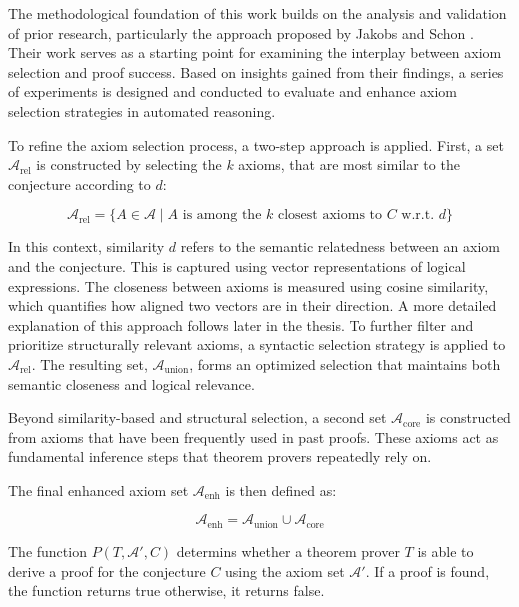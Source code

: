 \documentclass[english,version-2020-11]{uzl-thesis}
\begin{document}
The methodological foundation of this work builds on the analysis and validation of prior research, particularly the approach proposed by Jakobs and Schon \cite{Schon2024}. Their work serves as a starting point for examining the interplay between axiom selection and proof success. Based on insights gained from their findings, a series of experiments is designed and conducted to evaluate and enhance axiom selection strategies in automated reasoning.

To refine the axiom selection process, a two-step approach is applied. First, a set \( \mathcal{A}_{\text{rel}} \) is constructed by selecting the \( k \)  axioms, that are most similar to the conjecture according to \( d \):

\begin{equation}
    \mathcal{A}_{\text{rel}} = \{ A \in \mathcal{A} \mid A \text{ is among the } k \text{ closest axioms to } C \text{ w.r.t. } d \}
\end{equation}

In this context, similarity \( d \) refers to the semantic relatedness between an axiom and the conjecture. This is captured using vector representations of logical expressions. The closeness between axioms is measured using cosine similarity, which quantifies how aligned two vectors are in their direction. A more detailed explanation of this approach follows later in the thesis.
To further filter and prioritize structurally relevant axioms, a syntactic selection strategy is applied to \( \mathcal{A}_{\text{rel}} \). The resulting set, \( \mathcal{A}_{\text{union}} \), forms an optimized selection that maintains both semantic closeness and logical relevance.

Beyond similarity-based and structural selection, a second set \( \mathcal{A}_{\text{core}} \) is constructed from axioms that have been frequently used in past proofs. These axioms act as fundamental inference steps that theorem provers repeatedly rely on.

The final enhanced axiom set \( \mathcal{A}_{\text{enh}} \) is then defined as:

\begin{equation}
    \mathcal{A}_{\text{enh}} = \mathcal{A}_{\text{union}} \cup \mathcal{A}_{\text{core}}
\end{equation}

The function \( P(T, \mathcal{A}', C) \) determins whether a theorem prover \( T \) is able to derive a proof for the conjecture \( C \) using the axiom set \( \mathcal{A}' \). If a proof is found, the function returns true otherwise, it returns false.
\end{document}
